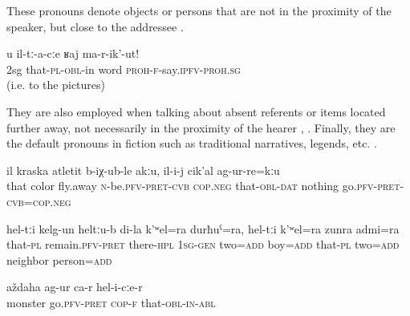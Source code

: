 These pronouns denote objects or persons that are not in the proximity of the speaker, but close to the addressee .

\begin{exe}
		\label{Do not talk to them! (i.e. to the pictures)}
	\sn
	\gll	u	il-tː-a-cːe	ʁaj	ma-r-ik'-ut!\\
		2sg	that-\textsc{pl}-\textsc{obl}-in	word	\textsc{proh}-\textsc{f}-say.\textsc{ipfv}-\textsc{proh.sg}\\
	\glt	{} (i.e. to the pictures)
\end{exe}

They are also employed when talking about absent referents or items located further away, not necessarily in the proximity of the hearer , . Finally, they are the default pronouns in fiction such as traditional narratives, legends, etc. .

\begin{exe}
		\label{The color does not fly off, nothing happened to it.}
	\sn
	\gll	il	kraska	atletit	b-iχ-ub-le akːu, 	il-i-j	cik'al	ag-ur-re=kːu\\
		that	color	fly.away	\textsc{n}-be.\textsc{pfv}-\textsc{pret}-\textsc{cvb} \textsc{cop.neg}	that-\textsc{obl}-\textsc{dat} nothing	go.\textsc{pfv}-\textsc{pret}-\textsc{cvb}=\textsc{cop.neg}\\
	\glt	{}

		\label{They remained there, my two sons and those two neighbors.}
	\sn
	\gll	hel-tːi	kelg-un	heltːu-b	di-la	k'ʷel=ra	durħuˁ=ra,	hel-tːi	k'ʷel=ra	zunra	admi=ra\\
		that-\textsc{pl}	remain.\textsc{pfv}-\textsc{pret}	there-\textsc{hpl}	\textsc{1sg-gen}	two=\textsc{add}	boy=\textsc{add}	that-\textsc{pl}	two=\textsc{add}	neighbor	person=\textsc{add}\\
	\glt	{}

	\ex	\label{She turned into a monster.}
	\gll	aždaha	ag-ur ca-r	hel-i-cːe-r \\
		monster	go.\textsc{pfv}-\textsc{pret} \textsc{cop-f}	that-\textsc{obl-in}-\textsc{abl}\\
	\glt	{}
\end{exe}


